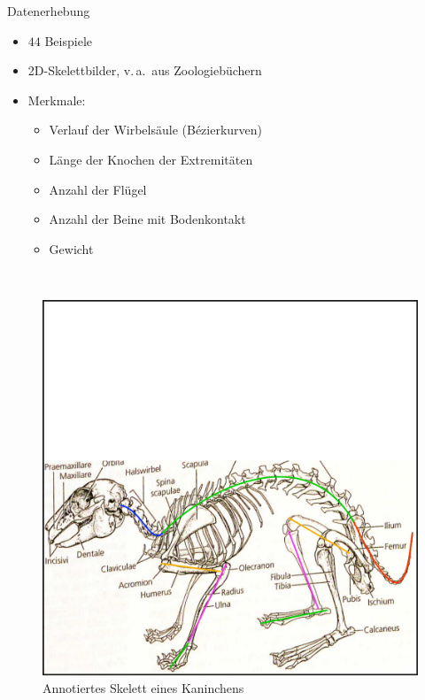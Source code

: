 \documentclass{beamer}
\newcommand{\va}{v.\,a.\ }
\begin{document}
\begin{frame}{Datenerhebung}
 \begin{minipage}{0.5\textwidth}
  \begin{itemize}
   \item $44$ Beispiele
   \item 2D-Skelettbilder, \va aus Zoologiebüchern
   \item Merkmale: 
   \begin{itemize}
    \item Verlauf der Wirbelsäule (Bézierkurven)
    \item Länge der Knochen der Extremitäten
    \item Anzahl der Flügel
    \item Anzahl der Beine mit Bodenkontakt
    \item Gewicht
   \end{itemize}
  \end{itemize}
 \end{minipage}~
 \begin{minipage}{0.5\textwidth}
  \begin{figure}
  \centering
  \includegraphics[width=\textwidth]{../../PCA/Skelettbilder/Kaninchen_farbig.png}
  \caption{Annotiertes Skelett eines Kaninchens}
 \end{figure}
 \end{minipage}
\end{frame}
\end{document}
